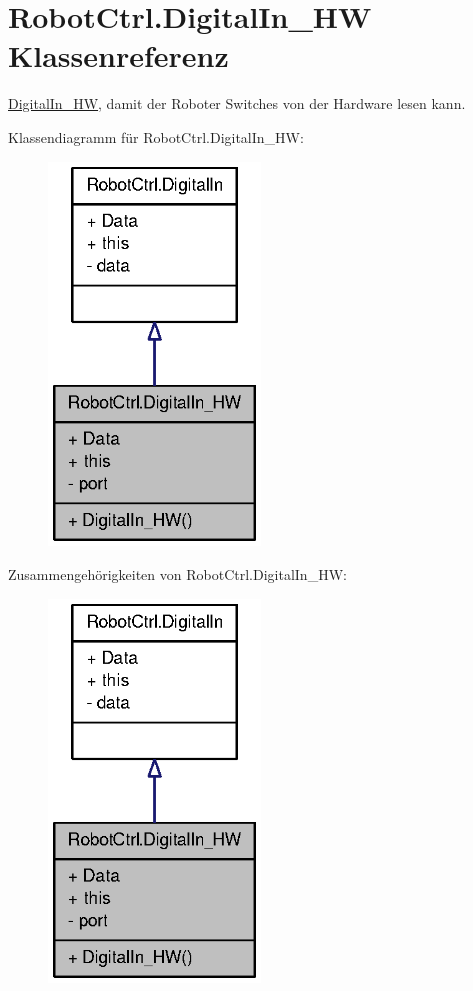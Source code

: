 \hypertarget{class_robot_ctrl_1_1_digital_in___h_w}{
\section{RobotCtrl.DigitalIn\_\-HW Klassenreferenz}
\label{class_robot_ctrl_1_1_digital_in___h_w}
}


\hyperlink{class_robot_ctrl_1_1_digital_in___h_w}{DigitalIn\_\-HW}, damit der Roboter Switches von der Hardware lesen kann.  




Klassendiagramm für RobotCtrl.DigitalIn\_\-HW:\nopagebreak
\begin{figure}[H]
\begin{center}
\leavevmode
\includegraphics[width=160pt]{class_robot_ctrl_1_1_digital_in___h_w__inherit__graph}
\end{center}
\end{figure}


Zusammengehörigkeiten von RobotCtrl.DigitalIn\_\-HW:\nopagebreak
\begin{figure}[H]
\begin{center}
\leavevmode
\includegraphics[width=160pt]{class_robot_ctrl_1_1_digital_in___h_w__coll__graph}
\end{center}
\end{figure}
